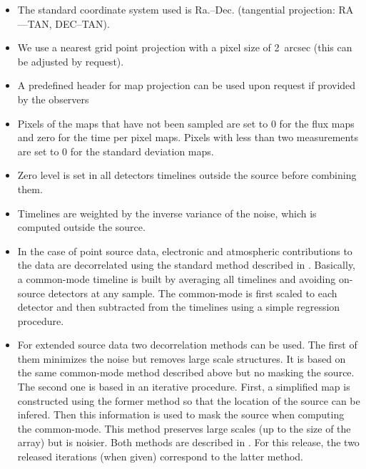 \documentclass[a4paper,10pt]{article}
\begin{document}
\begin{itemize}
\item The standard coordinate system used is Ra.--Dec. (tangential projection:
  RA---TAN, DEC--TAN).

\item We use a nearest grid point projection with a pixel size of 2~arcsec
  (this can be adjusted by request). 

\item A predefined header for map projection can be used upon request if
  provided by the observers

\item Pixels of the maps that have not been sampled are set to 0 for the
  flux maps and zero for the time per pixel maps. Pixels with less than two measurements are set to
  0 for the standard deviation maps.

\item Zero level is set in all detectors timelines outside the source before
  combining them.

\item Timelines are weighted by the inverse variance of the noise, which is
  computed outside the source.

\item In the case of point source data, electronic and atmospheric
  contributions to the data are decorrelated using the standard method
  described in \cite{NIKA_abs_calib}. Basically, a common-mode timeline is
  built by averaging all timelines and avoiding on-source detectors at any
  sample.  The common-mode is first scaled to each detector and then
  subtracted from the timelines using a simple regression procedure.

\item For extended source data two decorrelation methods can be used. The
  first of them minimizes the noise but removes large scale structures. It is
  based on the same common-mode method described above but no masking the
  source. The second one is based in an iterative procedure. First, a
  simplified map is constructed using the former method so that the location
  of the source can be infered. Then this information is used to mask the
  source when computing the common-mode. This method preserves large scales
  (up to the size of the array) but is noisier. Both methods are described in
  \cite{NIKA_abs_calib}. For this release, the two released iterations (when
  given) correspond to the latter method.

\end{itemize}
\end{document}

